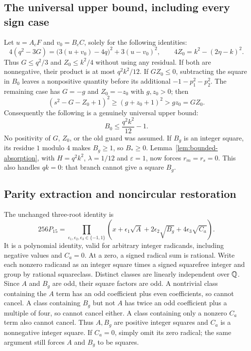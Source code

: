 \subsection{The universal upper bound, including every sign case}
Let $u=A_cF$ and $v_0=B_cC$, solely for the following identities:
\[
 4(q^2-3G)=\bigl(3(u+v_0)-4q\bigr)^2+3(u-v_0)^2,
 \qquad
 4Z_0=k^2-(2\eta-k)^2.
\]
Thus $G\leq q^2/3$ and $Z_0\leq k^2/4$ without using any residual.
If both are nonnegative, their product is at most $q^2k^2/12$.
If $GZ_0\leq0$, subtracting the square in $B_0$ leaves a nonpositive
quantity before its additional $-1-p_1^2-p_2^2$.
The remaining case has $G=-g$ and $Z_0=-z_0$ with $g,z_0>0$;
then
\[
 (s^2-G-Z_0+1)^2\geq(g+z_0+1)^2>gz_0=GZ_0.
\]
Consequently the following is a genuinely universal upper bound:
\begin{equation}
 B_0\leq\frac{q^2k^2}{12}-1.
 \label{eq:guard-global-bound}
\end{equation}
No positivity of $G$, $Z_0$, or the old guard was assumed.
If $B_g$ is an integer square, its residue $1$ modulo $4$ makes
$B_g\geq1$, so $B_*\geq0$.
Lemma~\ref{lem:bounded-absorption}, with $H=q^2k^2$,
$\lambda=1/12$ and $\varepsilon=1$, now forces $r_m=r_s=0$.
This also handles $qk=0$: that branch cannot give a square $B_g$.

\subsection{Parity extraction and noncircular restoration}
The unchanged three-root identity is
\begin{equation}
 256P_{15}=
 \prod_{\epsilon_1,\epsilon_2,\epsilon_3\in\{-1,1\}}
 \left(x+\epsilon_1\sqrt A+2\epsilon_2\sqrt{B_g}
                 +4\epsilon_3\sqrt{C_a}\right).
 \label{eq:absorbed-norm-identity}
\end{equation}
It is a polynomial identity, valid for arbitrary integer radicands,
including negative values and $C_a=0$.
At a zero, a signed radical sum is rational. Write each nonzero
radicand as an integer square times a signed squarefree integer and
group by rational squareclass. Distinct classes are linearly independent
over $\mathbb Q$. Since $A$ and $B_g$ are odd, their square factors are odd.
A nontrivial class containing the $A$ term has an odd coefficient plus
even coefficients, so cannot cancel. A class containing $B_g$ but not
$A$ has twice an odd coefficient plus a multiple of four, so cannot
cancel either. A class containing only a nonzero $C_a$ term also cannot
cancel. Thus $A,B_g$ are positive integer squares and $C_a$ is a
nonnegative integer square. If $C_a=0$, simply omit its zero radical;
the same argument still forces $A$ and $B_g$ to be squares.

